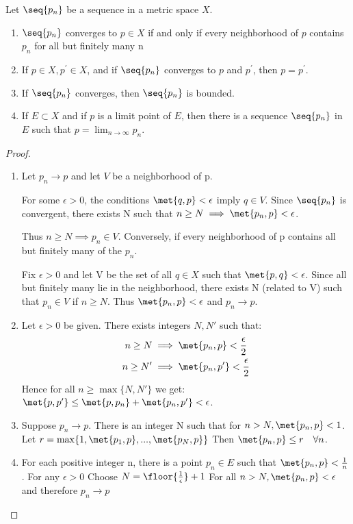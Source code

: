 \documentclass[12pt, letterpaper]{paper}
\begin{document}
\begin{theorem}
  \label{thr:3.2}
  Let $\seq{p_n}$ be a sequence in a metric space $X$.
  
  \begin{enumerate}
  \item $\seq{p_n}$ converges to $p \in X$ if and only if every
    neighborhood of $p$ contains $p_n$ for all but finitely many n
  \item If $p \in X, p^{\prime} \in X$, and if $\seq{p_n}$ converges
    to $p$ and $p^{\prime}$, then $p = p^{\prime}$.
  \item If $\seq{p_n}$ converges, then $\seq{p_n}$ is bounded.
  \item If $E \subset X$ and if $p$ is a limit point of $E$, then
    there is a sequence $\seq{p_n}$ in $E$ such that
    $p = \lim_{n \to \infty} p_n$.
  \end{enumerate}
\end{theorem}
\begin{proof}
  \begin{enumerate}
  \item Let $p_n \to p$ and let $V$ be a neighborhood of p.

    For some $\epsilon>0$, the conditions $\met{q,p} < \epsilon$ imply
    $q\in V$. Since $\seq{p_n}$ is convergent, there exists N such
    that $n \geq N \implies \met{p_n,p} < \epsilon$.

    Thus $n \geq N \implies p_n \in V$.  Conversely, if every
    neighborhood of p contains all but finitely many of the $p_n$.

    Fix $\epsilon > 0$ and let V be the set of all $q \in X$ such that
    $\met{p,q} < \epsilon$. Since all but finitely many lie in the
    neighborhood, there exists N (related to V) such that $p_n \in V$
    if $n \geq N$. Thus $\met{p_n,p}< \epsilon$ and $p_n \to p$.
  
  \item Let $\epsilon > 0$ be given. There exists integers $N, N'$
    such that:
    \begin{align*}
      n \geq N &\implies \met{ p_n, p} < \frac{\epsilon}{2}\\
      n \geq N' &\implies \met{ p_n, p'} < \frac{\epsilon}{2}\\
    \end{align*}
    Hence for all $n \geq \max \{ N, N' \}$ we get:
    $\met{p,p'} \leq \met{ p, p_n } + \met{ p_n, p'} < \epsilon$.
  
  \item Suppose $p_n \to p$. There is an integer N such that for
    $n > N, \met{p_n, p} < 1$. Let
    $r = \max\{ 1, \met{ p_1, p}, ..., \met{ p_N, p}\}$ Then
    $\met{p_n,p} \leq r \quad \forall n$.
  
  \item For each positive integer n, there is a point $p_n \in E$ such
    that $\met{p_n,p} < \frac{1}{n}$. For any $\epsilon > 0$ Choose
    $N = \floor{\frac{1}{\epsilon}}+1$ For all
    $n > N, \met{ p_n, p} < \epsilon$ and therefore $p_n \to p$
  \end{enumerate}
\end{proof}
\end{document}
